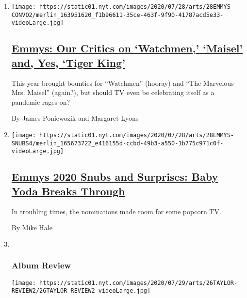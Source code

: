 \begin{enumerate}
\def\labelenumi{\arabic{enumi}.}
\item
  \texttt{[image: https://static01.nyt.com/images/2020/07/28/arts/28EMMYS-CONVO2/merlin\_163951620\_f1b96611-35ce-463f-9f90-41787acd5e33-videoLarge.jpg]}

  \hypertarget{emmys-our-critics-on-watchmen-maisel-and-yes-tiger-king}{%
  \subsection{\texorpdfstring{\href{/2020/07/28/arts/television/emmys-watchmen-handmaids-tale-tiger-king.html}{Emmys:
  Our Critics on `Watchmen,' `Maisel' and, Yes, `Tiger
  King'}}{Emmys: Our Critics on `Watchmen,' `Maisel' and, Yes, `Tiger King'}}\label{emmys-our-critics-on-watchmen-maisel-and-yes-tiger-king}}

  This year brought bounties for ``Watchmen'' (hooray) and ``The
  Marvelous Mrs. Maisel'' (again?), but should TV even be celebrating
  itself as a pandemic rages on?

  By James Poniewozik and Margaret Lyons
\item
  \texttt{[image: https://static01.nyt.com/images/2020/07/28/arts/28EMMYS-SNUBS4/merlin\_165673722\_e416155d-ccbd-49b3-a550-1b775c971c0f-videoLarge.jpg]}

  \hypertarget{emmys-2020-snubs-and-surprises-baby-yoda-breaks-through}{%
  \subsection{\texorpdfstring{\href{/2020/07/28/arts/television/emmys-snubs-mandalorian-zendaya-reese.html}{Emmys
  2020 Snubs and Surprises: Baby Yoda Breaks
  Through}}{Emmys 2020 Snubs and Surprises: Baby Yoda Breaks Through}}\label{emmys-2020-snubs-and-surprises-baby-yoda-breaks-through}}

  In troubling times, the nominations made room for some popcorn TV.

  By Mike Hale
\item ~
  \hypertarget{album-review}{%
  \subsubsection{Album Review}\label{album-review}}

  \texttt{[image: https://static01.nyt.com/images/2020/07/29/arts/26TAYLOR-REVIEW2/26TAYLOR-REVIEW2-videoLarge.jpg]}

  \hypertarget{taylor-swift-a-pop-star-done-with-pop}{%
}
\end{enumerate}
